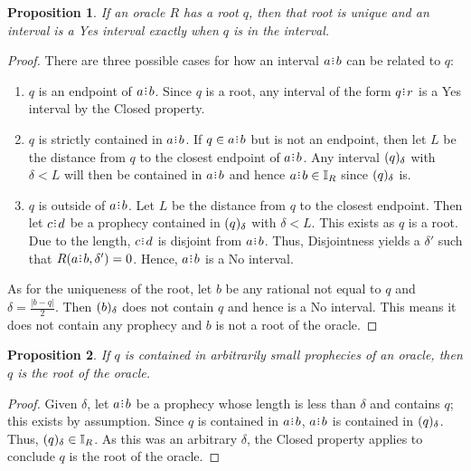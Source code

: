 \documentclass[12pt]{article}
\newtheorem{proposition}{Proposition}[section]
\begin{document}
\begin{proposition}\label{os-singular}
    If an oracle $R$ has a root $q$, then that root is unique and an interval is a Yes interval exactly when $q$ is in the interval.
\end{proposition}

\begin{proof}
    There are three possible cases for how an interval $a\rint b$ can be related to $q$: 

    \begin{enumerate}
        \item $q$ is an endpoint of $a\rint b$. Since $q$ is a root, any interval of the form $q\rint r$ is a Yes interval by the Closed property.
        \item $q$ is strictly contained in $a\rint b$. If $q \in a\rint b$ but is not an endpoint, then let $L$ be the distance from $q$ to the closest endpoint of $a\rint b$. Any interval $(q)_{\delta}$ with $\delta < L $ will then be contained in $a\rint b$ and hence $a\rint b \in \mathbb{I}_R$ since $(q)_{\delta}$ is. 
        \item $q$ is outside of $a\rint b$.  Let $L$ be the distance from $q$ to the closest endpoint. Then let $c\rint d$ be a prophecy contained in $(q)_{\delta}$ with $\delta < L$. This exists as $q$ is a root. Due to the length, $c\rint d$ is disjoint from $a\rint b$. Thus, Disjointness yields a $\delta'$ such that $R(a\rint b, \delta')= 0$. Hence, $a\rint b$ is a No interval. 
    \end{enumerate}
    
    As for the uniqueness of the root, let $b$ be any rational not equal to $q$ and $\delta = \frac{|b-q|}{2}$. Then $(b)_{\delta}$ does not contain $q$ and hence is a No interval. This means it does not contain any prophecy and $b$ is not a root of the oracle. 
\end{proof}


\begin{proposition}\label{os-rootsmallpro}
    If $q$ is contained in arbitrarily small prophecies of an oracle, then $q$ is the root of the oracle. 
\end{proposition}

\begin{proof}
    Given $\delta$, let $a\rint b$ be a prophecy whose length is less than $\delta$ and contains $q$; this exists by assumption. Since $q$ is contained in $a\rint b$, $a\rint b$ is contained in $(q)_{\delta}$. Thus, $(q)_{\delta} \in \mathbb{I}_R$. As this was an arbitrary $\delta$, the Closed property applies to conclude  $q$ is the root of the oracle. 
\end{proof}
\end{document}
